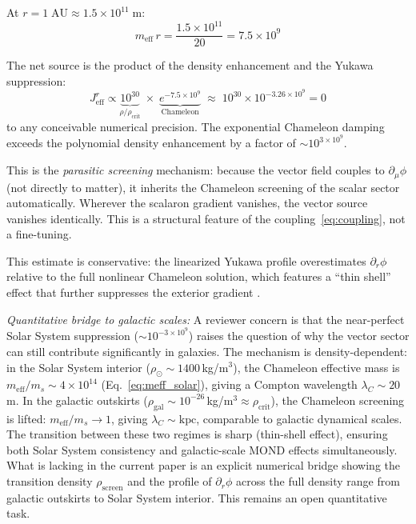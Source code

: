 \documentclass[aps,prd,twocolumn,superscriptaddress,nofootinbib]{revtex4-2}
\begin{document}
At $r = 1\;\mathrm{AU} \approx 1.5 \times 10^{11}\;\mathrm{m}$:
\begin{equation}
m_{\mathrm{eff}}\,r = \frac{1.5 \times 10^{11}}{20} = 7.5 \times 10^9
\end{equation}

The net source is the product of the density enhancement and the Yukawa suppression:
\begin{equation}
J^r_{\mathrm{eff}} \propto \underbrace{10^{30}}_{\rho/\rho_{\mathrm{crit}}} \;\times\; \underbrace{e^{-7.5 \times 10^9}}_{\text{Chameleon}} \;\approx\; 10^{30} \times 10^{-3.26 \times 10^9} = 0
\label{eq:parasitic}
\end{equation}
to any conceivable numerical precision. The exponential Chameleon damping exceeds the polynomial density enhancement by a factor of $\sim 10^{3 \times 10^9}$.

This is the \textit{parasitic screening} mechanism: because the vector field couples to $\partial_\mu\phi$ (not directly to matter), it inherits the Chameleon screening of the scalar sector automatically. Wherever the scalaron gradient vanishes, the vector source vanishes identically. This is a structural feature of the coupling~\eqref{eq:coupling}, not a fine-tuning.

This estimate is conservative: the linearized Yukawa profile overestimates $\partial_r\phi$ relative to the full nonlinear Chameleon solution, which features a ``thin shell'' effect that further suppresses the exterior gradient \cite{HuSawicki2007}.

\textit{Quantitative bridge to galactic scales:} A reviewer concern is that the near-perfect Solar System suppression ($\sim 10^{-3 \times 10^9}$) raises the question of why the vector sector can still contribute significantly in galaxies. The mechanism is density-dependent: in the Solar System interior ($\rho_\odot \sim 1400$\,kg/m$^3$), the Chameleon effective mass is $m_\mathrm{eff}/m_s \sim 4 \times 10^{14}$ (Eq.~\eqref{eq:meff_solar}), giving a Compton wavelength $\lambda_C \sim 20$\,m. In the galactic outskirts ($\rho_\mathrm{gal} \sim 10^{-26}$\,kg/m$^3 \approx \rho_\mathrm{crit}$), the Chameleon screening is lifted: $m_\mathrm{eff}/m_s \to 1$, giving $\lambda_C \sim \mathrm{kpc}$, comparable to galactic dynamical scales. The transition between these two regimes is sharp (thin-shell effect), ensuring both Solar System consistency and galactic-scale MOND effects simultaneously. What is lacking in the current paper is an explicit numerical bridge showing the transition density $\rho_\mathrm{screen}$ and the profile of $\partial_r\phi$ across the full density range from galactic outskirts to Solar System interior. This remains an open quantitative task.
\end{document}
